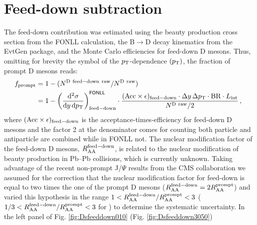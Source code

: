 \section{Feed-down subtraction}

The feed-down contribution was estimated using 
the beauty production cross section from the FONLL calculation,
the B$\rightarrow$D decay kinematics from the EvtGen package,
and the Monte Carlo efficiencies for feed-down D mesons. 
Thus, omitting for brevity the symbol of the $p_{\rm T}$-dependence $(p_{\rm T})$, 
the fraction of prompt D mesons reads:
\begin{equation}
 \label{eq:fcNbMethod}
 \begin{split}
   f_{\rm prompt} &= 1-(N^{\rm D~feed-down~raw}/N^{\rm D~raw})\\
   &= 1 -  \left( \frac{{\rm d}^2 \sigma}{{\rm d}y \, {\rm d}p_{\rm T} }
\right)^{{\sf FONLL}} _{{\rm feed-down}} \cdot
\frac{({\rm Acc}\times\epsilon)_{\rm feed-down}\cdot\Delta y \, \Delta p_{\rm T}
\cdot {\rm BR} \cdot L_{\rm int}  }{ N^{\rm D~raw }  / 2} \, ,
 \end{split}
\end{equation}
where $({\rm Acc}\times\epsilon)_{{\rm feed-down}}$ is the 
acceptance-times-efficiency for feed-down D mesons and the factor 2 at the denominator
comes for counting both particle and antiparticle
are combined while in FONLL not. The nuclear modification factor of the feed-down D mesons, $R_{\mathrm{AA}}^{\rm feed-down}$,
is related to the nuclear modification of beauty production in Pb--Pb 
collisions, which is currently unknown. Taking advantage of the
recent non-prompt J/$\Psi$ results from the CMS collaboration we
assumed for the correction that the nuclear modification factor 
for feed-down is equal to two times the one of the prompt D mesons ($R_{\mathrm{AA}}^{\rm feed-down}=2R_{\mathrm{AA}}^{\rm prompt}$) and varied this hypothesis
in the range $1<R_{\mathrm{AA}}^{\rm feed-down}/R_{\mathrm{AA}}^{\rm prompt}<3$ ($1/3<R_{\mathrm{AA}}^{\rm feed-down}/R_{\mathrm{AA}}^{\rm prompt}<3$ for \Dsubs)
to determine the systematic uncertainty. In the left panel of Fig. \ref{fig:Dsfeeddown010} (Fig. \ref{fig:Dsfeeddown3050})
